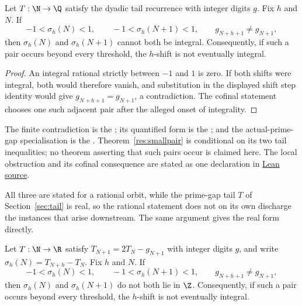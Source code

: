 \documentclass[11pt]{article}
\begin{document}
\begin{theorem}\label{res:smallpair}
Let $T:\N\to\Q$ satisfy the dyadic tail recurrence with integer digits $g$.
Fix $h$ and $N$.  If
\[
 -1<\sigma_h(N)<1,\qquad -1<\sigma_h(N+1)<1,
 \qquad g_{N+h+1}\ne g_{N+1},
\]
then $\sigma_h(N)$ and $\sigma_h(N+1)$ cannot both be integral.
Consequently, if such a pair occurs beyond every threshold, the $h$-shift is
not eventually integral.
\end{theorem}

\begin{proof}
An integral rational strictly between $-1$ and $1$ is zero.  If both shifts
were integral, both would therefore vanish, and substitution in the displayed
shift step identity would give $g_{N+h+1}=g_{N+1}$, a contradiction.  The
cofinal statement chooses one such adjacent pair after the alleged onset of
integrality.
\end{proof}

\noindent The finite contradiction is the
; its quantified form is the
; and the actual-prime-gap specialisation is the
.  Theorem~\ref{res:smallpair} is conditional on its two tail
inequalities; no theorem asserting that such pairs occur is claimed here.  The
local obstruction and its cofinal consequence are stated as one declaration in
\href{https://github.com/wcook04/plectis-erdos/blob/f36a98bf3d3e6f65f1074e3b800e3293d5b8a51a/ErdosProblems/Erdos251/PaperCoreR7.lean#L267}{Lean source}.

All three are stated for a rational orbit, while the prime-gap tail
$T$ of Section~\ref{sec:tail} is real, so the rational statement does
not on its own discharge the instances that arise downstream.  The same
argument gives the real form directly.

\begin{corollary}\label{res:smallpair-real}
Let $T:\N\to\R$ satisfy $T_{N+1}=2T_N-g_{N+1}$ with integer digits $g$, and
write $\sigma_h(N)=T_{N+h}-T_N$.  Fix $h$ and $N$.  If
\[
 -1<\sigma_h(N)<1,\qquad -1<\sigma_h(N+1)<1,
 \qquad g_{N+h+1}\ne g_{N+1},
\]
then $\sigma_h(N)$ and $\sigma_h(N+1)$ do not both lie in $\Z$.
Consequently, if such a pair occurs beyond every threshold, the $h$-shift is
not eventually integral.
\end{corollary}
\end{document}
